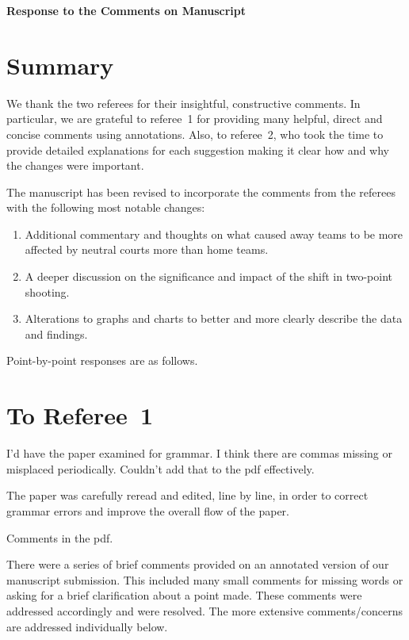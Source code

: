 \documentclass[12pt]{article}
\newenvironment{comment}%
{\begin{quoting}\noindent\small\it\ignorespaces%
  }{\end{quoting}}
\begin{document}
\begin{center}
  {\Large\bf Response to the Comments on Manuscript}
\end{center}

\section*{Summary}

We thank the two referees for their insightful, constructive
comments. In particular, we are grateful to referee~1 for providing many helpful, direct and concise comments using annotations. Also, to referee~2, who took the time to provide detailed explanations for each suggestion making it clear how and why the changes were important.


The manuscript has been revised to incorporate the comments from the
referees with the following most notable changes:

\begin{enumerate}
\item
  Additional commentary and thoughts on what caused away teams to be more affected by neutral courts more than home teams.
  \item
  A deeper discussion on the significance and impact of the shift in two-point shooting.
\item
  Alterations to graphs and charts to better and more clearly describe the data and findings.
\end{enumerate}

Point-by-point responses are as follows.


\section*{To Referee~1}

\begin{comment}
  I’d have the paper examined for grammar.  I think there are commas missing or misplaced periodically. Couldn’t add that to the pdf effectively.
\end{comment}

 The paper was carefully reread and edited, line by line, in order to correct grammar errors and improve the overall flow of the paper.
 
\begin{comment}
Comments in the pdf. 
\end{comment}

There were a series of brief comments provided on an annotated version of our manuscript submission. This included many small comments for missing words or asking for a brief clarification about a point made. These comments were addressed accordingly and were resolved. The more extensive comments/concerns are addressed individually below.
\end{document}
